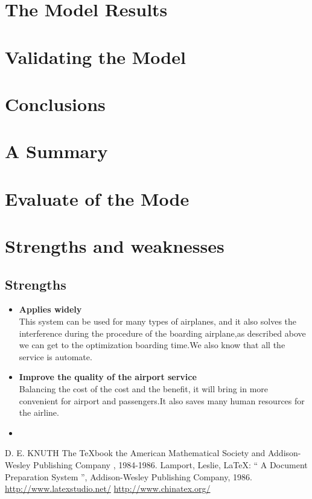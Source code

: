 \documentclass{mcmthesis}
\begin{document}
\section{The Model Results}
\lipsum[6]

\section{Validating the Model}
\lipsum[9]

\section{Conclusions}
\lipsum[6]

\section{A Summary}
\lipsum[6]

\section{Evaluate of the Mode}

\section{Strengths and weaknesses}
\lipsum[12]

\subsection{Strengths}
\begin{itemize}
\item \textbf{Applies widely}\\
This  system can be used for many types of airplanes, and it also
solves the interference during  the procedure of the boarding
airplane,as described above we can get to the  optimization
boarding time.We also know that all the service is automate.
\item \textbf{Improve the quality of the airport service}\\
Balancing the cost of the cost and the benefit, it will bring in
more convenient  for airport and passengers.It also saves many
human resources for the airline. \item \textbf{}
\end{itemize}

\begin{thebibliography}{99}
 D. E. KNUTH   The \TeX{}book  the American
Mathematical Society and Addison-Wesley
Publishing Company , 1984-1986.
Lamport, Leslie,  \LaTeX{}: `` A Document Preparation System '',
Addison-Wesley Publishing Company, 1986.
\url{http://www.latexstudio.net/}
\url{http://www.chinatex.org/}
\end{thebibliography}
\end{document}
